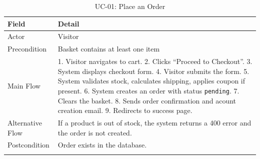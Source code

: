 \begin{longtable}{|m{3.5cm}|m{10cm}|}
    \hline
    \textbf{Field}   & \textbf{Detail}                                                                                                                                                                                                                                                                                                                                                                \\
    \hline
    \endhead
    \endfoot
    \endlastfoot
    \hline
    Actor            & Visitor                                                                                                                                                                                                                                                                                                                                                                        \\
    \hline
    Precondition     & Basket contains at least one item                                                                                                                                                                                                                                                                                                                                              \\
    \hline
    Main Flow        & 1. Visitor navigates to cart. 2. Clicks ``Proceed to Checkout''. 3. System displays checkout form. 4. Visitor submits the form. 5. System validates stock, calculates shipping, applies coupon if present. 6. System creates an order with status \texttt{pending}. 7. Clears the basket. 8. Sends order confirmation and acount creation email. 9. Redirects to success page. \\
    \hline
    Alternative Flow & If a product is out of stock, the system returns a 400 error and the order is not created.                                                                                                                                                                                                                                                                                     \\
    \hline
    Postcondition    & Order exists in the database.                                                                                                                                                                                                                                                                                                                                                  \\
    \hline
    \caption{UC-01: Place an Order}
    \label{tab:uc01}
\end{longtable}

